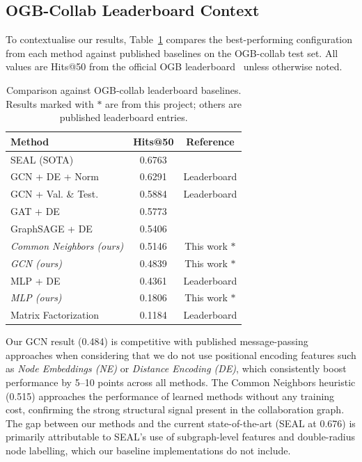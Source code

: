 \documentclass[12pt,a4paper]{article}
\begin{document}
\subsection{OGB-Collab Leaderboard Context}

To contextualise our results, Table~\ref{tab:leaderboard} compares the best-performing configuration from each method against published baselines on the OGB-collab test set. All values are Hits@50 from the official OGB leaderboard~\cite{ogb} unless otherwise noted.

\begin{table}[H]
\centering
\caption{Comparison against OGB-collab leaderboard baselines. Results marked with $*$ are from this project; others are published leaderboard entries.}
\label{tab:leaderboard}
\small
\begin{tabular}{lcc}
\toprule
\textbf{Method} & \textbf{Hits@50} & \textbf{Reference} \\
\midrule
SEAL (SOTA)                    & 0.6763 & \cite{zhang2020} \\
GCN + DE + Norm                & 0.6291 & Leaderboard \\
GCN + Val. \& Test.            & 0.5884 & Leaderboard \\
GAT + DE                       & 0.5773 & \cite{velickovic2018} \\
GraphSAGE + DE                 & 0.5406 & \cite{hamilton2017} \\
\emph{Common Neighbors (ours)} & 0.5146 & This work $*$ \\
\emph{GCN (ours)}              & 0.4839 & This work $*$ \\
MLP + DE                       & 0.4361 & Leaderboard \\
\emph{MLP (ours)}              & 0.1806 & This work $*$ \\
Matrix Factorization           & 0.1184 & Leaderboard \\
\bottomrule
\end{tabular}
\end{table}

Our GCN result (0.484) is competitive with published message-passing approaches when considering that we do not use positional encoding features such as \emph{Node Embeddings (NE)} or \emph{Distance Encoding (DE)}, which consistently boost performance by 5--10 points across all methods. The Common Neighbors heuristic (0.515) approaches the performance of learned methods without any training cost, confirming the strong structural signal present in the collaboration graph. The gap between our methods and the current state-of-the-art (SEAL at 0.676) is primarily attributable to SEAL's use of subgraph-level features and double-radius node labelling, which our baseline implementations do not include.
\end{document}
